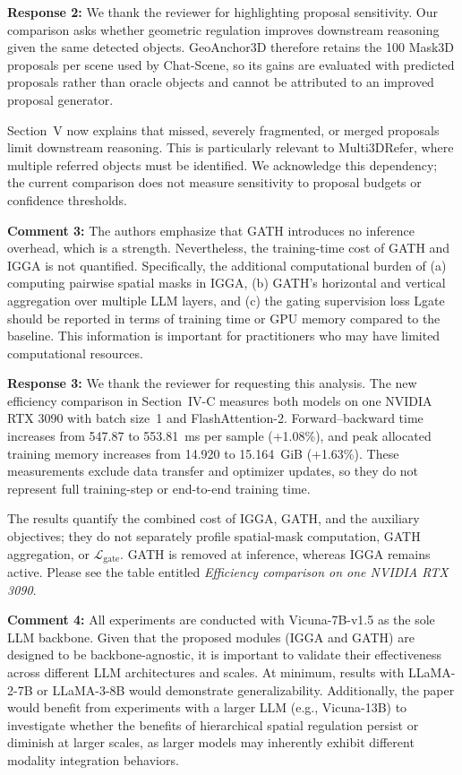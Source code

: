 \noindent\textbf{Response 2:}
We thank the reviewer for highlighting proposal sensitivity. Our comparison asks whether geometric regulation improves downstream reasoning given the same detected objects. GeoAnchor3D therefore retains the 100 Mask3D proposals per scene used by Chat-Scene, so its gains are evaluated with predicted proposals rather than oracle objects and cannot be attributed to an improved proposal generator.

Section~V now explains that missed, severely fragmented, or merged proposals limit downstream reasoning. This is particularly relevant to Multi3DRefer, where multiple referred objects must be identified. We acknowledge this dependency; the current comparison does not measure sensitivity to proposal budgets or confidence thresholds.
\vspace{\resafter}


{\noindent\color{comment}
\textbf{Comment 3:}
The authors emphasize that GATH introduces no inference overhead, which is a strength. Nevertheless, the training-time cost of GATH and IGGA is not quantified. Specifically, the additional computational burden of (a) computing pairwise spatial masks in IGGA, (b) GATH's horizontal and vertical aggregation over multiple LLM layers, and (c) the gating supervision loss Lgate should be reported in terms of training time or GPU memory compared to the baseline. This information is important for practitioners who may have limited computational resources.
}\vspace{\comafter}

\noindent\textbf{Response 3:}
We thank the reviewer for requesting this analysis. The new efficiency comparison in Section~IV-C measures both models on one NVIDIA RTX 3090 with batch size~1 and FlashAttention-2. Forward--backward time increases from 547.87 to 553.81~ms per sample (+1.08\%), and peak allocated training memory increases from 14.920 to 15.164~GiB (+1.63\%). These measurements exclude data transfer and optimizer updates, so they do not represent full training-step or end-to-end training time.

The results quantify the combined cost of IGGA, GATH, and the auxiliary objectives; they do not separately profile spatial-mask computation, GATH aggregation, or $\mathcal{L}_{\mathrm{gate}}$. GATH is removed at inference, whereas IGGA remains active. Please see the table entitled \textit{Efficiency comparison on one NVIDIA RTX 3090}.
\vspace{\resafter}


{\noindent\color{comment}
\textbf{Comment 4:}
All experiments are conducted with Vicuna-7B-v1.5 as the sole LLM backbone. Given that the proposed modules (IGGA and GATH) are designed to be backbone-agnostic, it is important to validate their effectiveness across different LLM architectures and scales. At minimum, results with LLaMA-2-7B or LLaMA-3-8B would demonstrate generalizability. Additionally, the paper would benefit from experiments with a larger LLM (e.g., Vicuna-13B) to investigate whether the benefits of hierarchical spatial regulation persist or diminish at larger scales, as larger models may inherently exhibit different modality integration behaviors.
}\vspace{\comafter}

